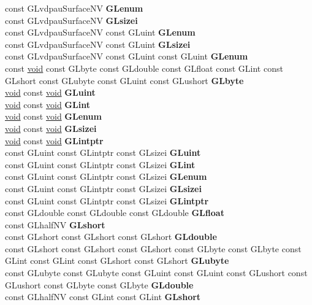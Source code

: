 \begin{DoxyCompactItemize}
\begin{tabbing}
\>const GLvdpauSurfaceNV {\bfseries GLenum}\\
\>const GLvdpauSurfaceNV {\bfseries GLsizei}\\
\>const GLvdpauSurfaceNV const GLuint {\bfseries GLenum}\\
\>const GLvdpauSurfaceNV const GLuint {\bfseries GLsizei}\\
\>const GLvdpauSurfaceNV const GLuint const GLuint {\bfseries GLenum}\\
\>const \hyperlink{interfacevoid}{void} const GLbyte const GLdouble const GLfloat const GLint const GLshort const GLubyte const GLuint const GLushort {\bfseries GLbyte}\\
\>\hyperlink{interfacevoid}{void} const \hyperlink{interfacevoid}{void} {\bfseries GLuint}\\
\>\hyperlink{interfacevoid}{void} const \hyperlink{interfacevoid}{void} {\bfseries GLint}\\
\>\hyperlink{interfacevoid}{void} const \hyperlink{interfacevoid}{void} {\bfseries GLenum}\\
\>\hyperlink{interfacevoid}{void} const \hyperlink{interfacevoid}{void} {\bfseries GLsizei}\\
\>\hyperlink{interfacevoid}{void} const \hyperlink{interfacevoid}{void} {\bfseries GLintptr}\\
\>const GLuint const GLintptr const GLsizei {\bfseries GLuint}\\
\>const GLuint const GLintptr const GLsizei {\bfseries GLint}\\
\>const GLuint const GLintptr const GLsizei {\bfseries GLenum}\\
\>const GLuint const GLintptr const GLsizei {\bfseries GLsizei}\\
\>const GLuint const GLintptr const GLsizei {\bfseries GLintptr}\\
\>const GLdouble const GLdouble const GLdouble {\bfseries GLfloat}\\
\>const GLhalfNV {\bfseries GLshort}\\
\>const GLshort const GLshort const GLshort {\bfseries GLdouble}\\
\>const GLshort const GLshort const GLshort const GLbyte const GLbyte const GLint const GLint const GLshort const GLshort {\bfseries GLubyte}\\
\>const GLubyte const GLubyte const GLuint const GLuint const GLushort const GLushort const GLbyte const GLbyte {\bfseries GLdouble}\\
\>const GLhalfNV const GLint const GLint {\bfseries GLshort}\\

\end{tabbing}
\end{DoxyCompactItemize}
